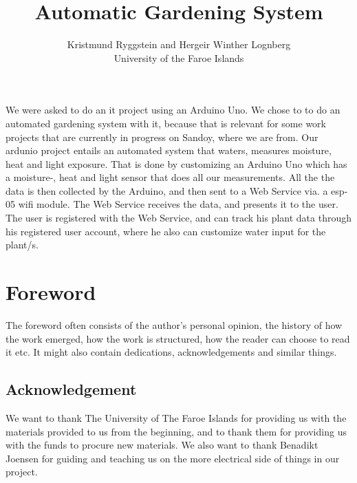 \documentclass[a4paper,12pt,twoside,openright,titlepage]{book}
\title{Automatic Gardening System}
\author{Kristmund Ryggstein and Hergeir Winther Lognberg \\ University of the Faroe Islands\\}
\newenvironment{abstract}%
{\cleardoublepage\addcontentsline{toc}{chapter}{Abstract}\null\vfill\begin{center}%
\bfseries\abstractname\end{center}}%
{\vfill\null}
\begin{document}
\frontmatter
\maketitle

\frontmatter
\maketitle

\begin{abstract}
We were asked to do an it project using an Arduino Uno. We chose to to do an automated gardening system with it, because that is relevant for some work projects that are currently in progress on Sandoy, where we are from. Our ardunio project entails an automated system that waters, measures moisture, heat and light exposure. That is done by customizing an Arduino Uno which has a moisture-, heat and light sensor that does all our measurements. All the the data is then collected by the Arduino, and then sent to a Web Service via. a esp-05 wifi module. The Web Service receives the data, and presents it to the user. The user is registered with the Web Service, and can track his plant data through his registered user account, where he also can customize water input for the plant/s.
\end{abstract}

\cleardoublepage{}
\tableofcontents

\chapter{Foreword}


The foreword often consists of the author's personal opinion, the history of how the work emerged, how the work is structured, how the reader can choose to read it etc. It might also contain dedications, acknowledgements and similar things. 

\section*{Acknowledgement}
We want to thank The University of The Faroe Islands for providing us with the materials provided to us from the beginning, and to thank them for providing us with the funds to procure new materials. We also want to thank Benadikt Joensen for guiding  and teaching us on the more electrical side of things in our project.
\end{document}

